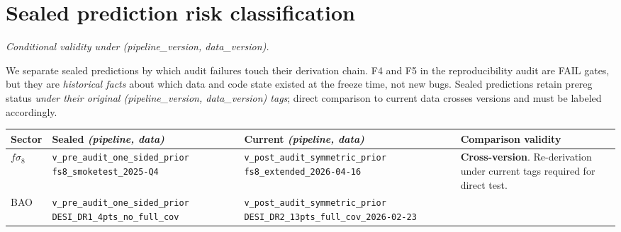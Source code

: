 \documentclass[11pt]{article}
\begin{document}
\section{Sealed prediction risk classification}
\label{sec:sealed}
\textit{Conditional validity under (pipeline\_version, data\_version).}

We separate sealed predictions by which audit failures touch their
derivation chain. F4 and F5 in the reproducibility audit are FAIL gates,
but they are \emph{historical facts} about which data and code state
existed at the freeze time, not new bugs. Sealed predictions retain
prereg status \emph{under their original (pipeline\_version,
data\_version) tags}; direct comparison to current data crosses versions
and must be labeled accordingly.

\begin{table}[h]
\centering
\footnotesize
\setlength{\tabcolsep}{5pt}
\begin{tabularx}{\linewidth}{@{}L{1.8cm} Y Y L{3.5cm}@{}}
\toprule
{}
\textbf{Sector} & \textbf{Sealed} \emph{(pipeline, data)} & \textbf{Current} \emph{(pipeline, data)} & \textbf{Comparison validity} \\
\midrule
$f\sigma_8$ &
\texttt{\footnotesize v\_pre\_audit\_}\linebreak\texttt{\footnotesize one\_sided\_prior}\newline
\texttt{\footnotesize fs8\_smoketest\_}\linebreak\texttt{\footnotesize 2025-Q4} &
\texttt{\footnotesize v\_post\_audit\_}\linebreak\texttt{\footnotesize symmetric\_prior}\newline
\texttt{\footnotesize fs8\_extended\_}\linebreak\texttt{\footnotesize 2026-04-16} &
\textcolor{ered}{\textbf{Cross-version}}. Re-derivation under current tags required for direct test. \\
\addlinespace[3pt]
BAO &
\texttt{\footnotesize v\_pre\_audit\_}\linebreak\texttt{\footnotesize one\_sided\_prior}\newline
\texttt{\footnotesize DESI\_DR1\_4pts\_}\linebreak\texttt{\footnotesize no\_full\_cov} &
\texttt{\footnotesize v\_post\_audit\_}\linebreak\texttt{\footnotesize symmetric\_prior}\newline
\texttt{\footnotesize DESI\_DR2\_13pts\_}\linebreak\texttt{\footnotesize full\_cov\_2026-02-23} &

\end{tabularx}
\end{table}
\end{document}
